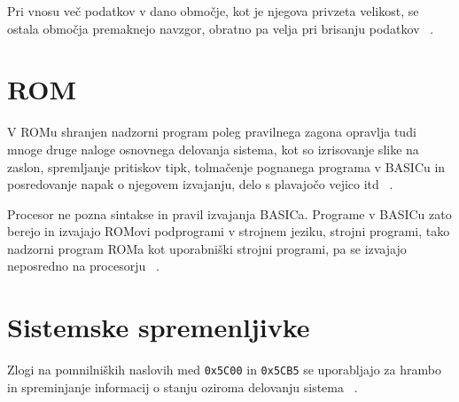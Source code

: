 \documentclass[a4paper, 12pt, openright]{book}
\begin{document}
    Pri vnosu več podatkov v dano območje, kot je njegova privzeta velikost, se
    ostala območja premaknejo navzgor, obratno pa velja pri brisanju podatkov ~\cite{zxspectrumbasicprogramming}.

    \section{ROM}

    V ROMu shranjen nadzorni program poleg pravilnega zagona opravlja tudi mnoge druge
    naloge osnovnega delovanja sistema, kot so izrisovanje slike na zaslon, spremljanje
    pritiskov tipk, tolmačenje pognanega programa v BASICu in posredovanje napak
    o njegovem izvajanju, delo s plavajočo vejico itd ~\cite{strojnijezikzaprocesorz80,
    zxspectrumintroduction}.

    Procesor ne pozna sintakse in pravil izvajanja BASICa. Programe v BASICu zato
    berejo in izvajajo ROMovi podprogrami v strojnem jeziku, strojni programi, tako
    nadzorni program ROMa kot uporabniški strojni programi, pa se izvajajo
    neposredno na procesorju ~\cite{strojnijezikzaprocesorz80}.

    \section{Sistemske spremenljivke}
    Zlogi na pomnilniških naslovih med \texttt{0x5C00} in \texttt{0x5CB5} se uporabljajo
    za hrambo in spreminjanje informacij o stanju oziroma delovanju sistema ~\cite{zxspectrumbasicprogramming}.
\end{document}
